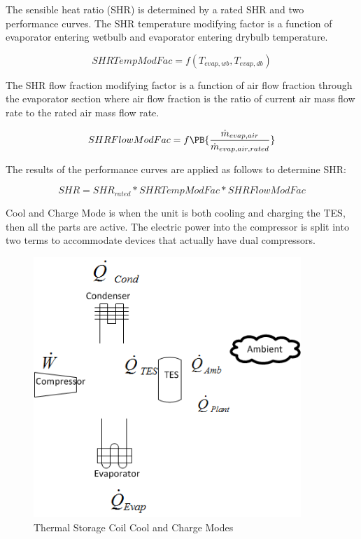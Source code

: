 The sensible heat ratio (SHR) is determined by a rated SHR and two performance curves. The SHR temperature modifying factor is a function of evaporator entering wetbulb and evaporator entering drybulb temperature.

\begin{equation}
SHRTempModFac = f\left( {{T_{evap,wb}},{T_{evap,db}}} \right)
\end{equation}

The SHR flow fraction modifying factor is a function of air flow fraction through the evaporator section where air flow fraction is the ratio of current air mass flow rate to the rated air mass flow rate.

\begin{equation}
  SHRFlowModFac = f\PB{\frac{\dot{m}_{evap,air}}{\dot{m}_{evap,air,rated}}}
\end{equation}

The results of the performance curves are applied as follows to determine SHR:

\begin{equation}
SHR = SH{R_{rated}}*SHRTempModFac*SHRFlowModFac
\end{equation}

Cool and Charge Mode is when the unit is both cooling and charging the TES, then all the parts are active. The electric power into the compressor is split into two terms to accommodate devices that actually have dual compressors.

\begin{figure}[hbtp] %
\centering
\includegraphics[width=0.9\textwidth, height=0.9\textheight, keepaspectratio=true]{media/image4309.png}
\caption{Thermal Storage Coil Cool and Charge Modes \protect \label{fig:thermal-storage-coil-cool-and-charge-modes}}
\end{figure}

